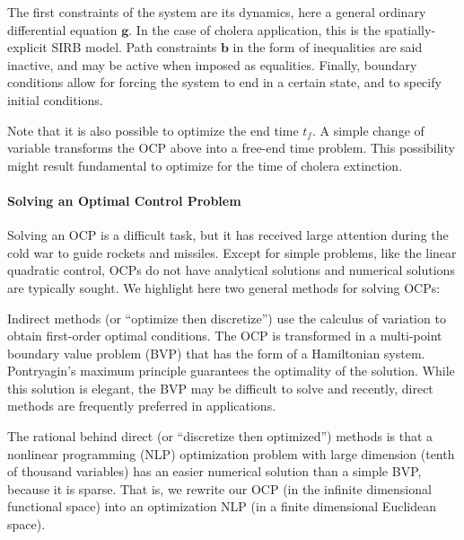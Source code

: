 The first constraints of the system are its dynamics, here a general ordinary differential equation $\textbf{g}$. In the case of cholera application, this is the spatially-explicit SIRB model. Path constraints $\textbf{b}$ in the form of inequalities are said inactive, and may be active when imposed as equalities. Finally, boundary conditions allow for forcing the system to end in a certain state, and to specify initial conditions.

Note that it is also possible to optimize the end time $t_f$. A simple change of variable transforms the OCP above into a free-end time problem. This possibility might result fundamental to optimize for the time of cholera extinction.

\paragraph{Solving an Optimal Control Problem}
Solving an OCP is a difficult task, but it  has received large attention during the cold war to guide rockets and missiles. Except for simple problems, like the linear quadratic  control, OCPs do not have analytical solutions and numerical solutions are typically sought. We highlight here two general methods for solving OCPs:

\par Indirect methods (or ``optimize then discretize'') use the calculus of variation to obtain first-order optimal conditions. The OCP is transformed in a multi-point boundary value problem (BVP) that has the form of a Hamiltonian system. Pontryagin's maximum principle guarantees the optimality of the solution. While this solution is elegant, the BVP may be difficult to solve and recently, direct methods are frequently preferred in applications.

\par The rational behind direct (or ``discretize then optimized'') methods is that a nonlinear programming (NLP) optimization problem with large dimension (tenth of thousand variables) has an easier numerical solution than a simple BVP, because it is sparse. That is, we rewrite our OCP (in the infinite dimensional functional space) into an optimization NLP (in a finite dimensional Euclidean space). 

